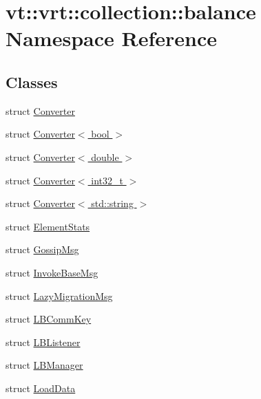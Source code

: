 \hypertarget{namespacevt_1_1vrt_1_1collection_1_1balance}{}\section{vt\+:\+:vrt\+:\+:collection\+:\+:balance Namespace Reference}
\label{namespacevt_1_1vrt_1_1collection_1_1balance}
\subsection*{Classes}
\begin{DoxyCompactItemize}
\item 
struct \hyperlink{structvt_1_1vrt_1_1collection_1_1balance_1_1_converter}{Converter}
\item 
struct \hyperlink{structvt_1_1vrt_1_1collection_1_1balance_1_1_converter_3_01bool_01_4}{Converter$<$ bool $>$}
\item 
struct \hyperlink{structvt_1_1vrt_1_1collection_1_1balance_1_1_converter_3_01double_01_4}{Converter$<$ double $>$}
\item 
struct \hyperlink{structvt_1_1vrt_1_1collection_1_1balance_1_1_converter_3_01int32__t_01_4}{Converter$<$ int32\+\_\+t $>$}
\item 
struct \hyperlink{structvt_1_1vrt_1_1collection_1_1balance_1_1_converter_3_01std_1_1string_01_4}{Converter$<$ std\+::string $>$}
\item 
struct \hyperlink{structvt_1_1vrt_1_1collection_1_1balance_1_1_element_stats}{Element\+Stats}
\item 
struct \hyperlink{structvt_1_1vrt_1_1collection_1_1balance_1_1_gossip_msg}{Gossip\+Msg}
\item 
struct \hyperlink{structvt_1_1vrt_1_1collection_1_1balance_1_1_invoke_base_msg}{Invoke\+Base\+Msg}
\item 
struct \hyperlink{structvt_1_1vrt_1_1collection_1_1balance_1_1_lazy_migration_msg}{Lazy\+Migration\+Msg}
\item 
struct \hyperlink{structvt_1_1vrt_1_1collection_1_1balance_1_1_l_b_comm_key}{L\+B\+Comm\+Key}
\item 
struct \hyperlink{structvt_1_1vrt_1_1collection_1_1balance_1_1_l_b_listener}{L\+B\+Listener}
\item 
struct \hyperlink{structvt_1_1vrt_1_1collection_1_1balance_1_1_l_b_manager}{L\+B\+Manager}
\item 
struct \hyperlink{structvt_1_1vrt_1_1collection_1_1balance_1_1_load_data}{Load\+Data}
\item 

\end{DoxyCompactItemize}
